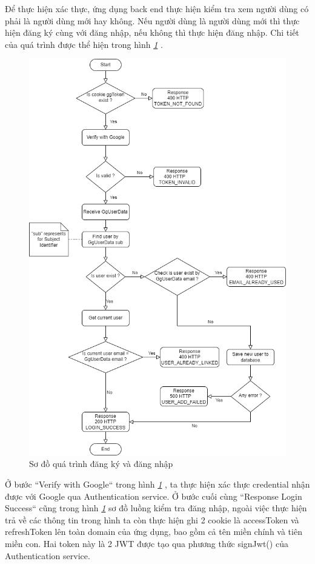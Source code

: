 Để thực hiện xác thực, ứng dụng back end thực hiện kiểm tra xem người dùng có phải là người dùng mới hay không.
Nếu người dùng là người dùng mới thì thực hiện đăng ký cùng với đăng nhập, nếu không thì thực hiện đăng nhập.
Chi tiết của quá trình được thể hiện trong hình \textit{\ref{fig:SignUpIn} }.

\begin{figure}[H]
  \centering
  \includegraphics[width=\textwidth]{applied-thesis-chapters/chapter-4/Sơ đồ quá trình đăng ký và đăng nhập.png}
  \caption{Sơ đồ quá trình đăng ký và đăng nhập}
  \label{fig:SignUpIn}
\end{figure}

Ở bước “Verify with Google“ trong hình \textit{\ref{fig:SignUpIn} }, ta thực hiện xác thực credential nhận được với Google qua Authentication service.
Ở bước cuối cùng “Response Login Success“ cũng trong hình \textit{\ref{fig:SignUpIn} } sơ đồ luồng kiểm tra đăng nhập, ngoài việc thực hiện trả về các thông tin trong hình ta còn thực hiện ghi 2 cookie là accessToken và refreshToken lên toàn domain của ứng dụng, bao gồm cả tên miền chính và tiên miền con. Hai token này là 2 JWT được tạo qua phương thức signJwt() của Authentication service.

